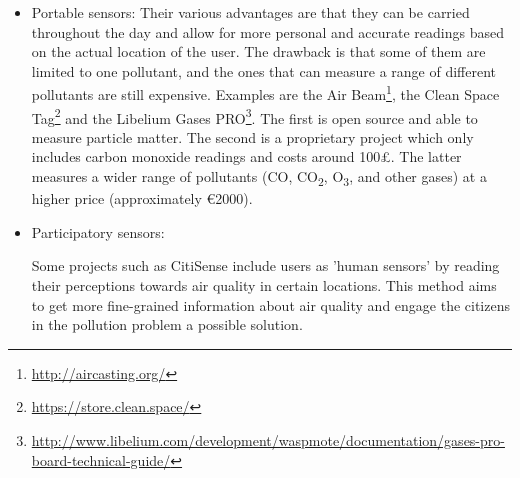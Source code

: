\begin{itemize}
\item Portable sensors: Their various advantages are that they can be carried throughout the day and allow for more personal and accurate readings based on the actual location of the user. The drawback is that some of them are limited to one pollutant, and the ones that can measure a range of different pollutants are still expensive. Examples are the Air Beam\footnote{\url{http://aircasting.org/}}, the Clean Space Tag\footnote{\url{https://store.clean.space/}} and the Libelium Gases PRO\footnote{\url{http://www.libelium.com/development/waspmote/documentation/gases-pro-board-technical-guide/}}. The first is open source and able to measure particle matter. The second is a proprietary project which only includes carbon monoxide readings and costs around 100\pounds. The latter measures a wider range of pollutants (CO, CO\textsubscript{2}, O\textsubscript{3}, \NOX and other gases) at a higher price (approximately \euro{}2000). 

\item Participatory sensors:

Some projects such as CitiSense \cite{Nikzad2012} include users as 'human sensors' by reading their perceptions towards air quality in certain locations. This method aims to get more fine-grained information about air quality and engage the citizens in the pollution problem a possible solution. 

\end{itemize}



